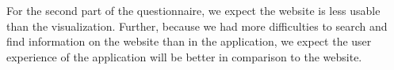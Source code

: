 For the second part of the questionnaire, we expect the website is less usable than the visualization. Further, because we had more difficulties to search and find information on the website than in the application, we expect the user experience of the application will be better in comparison to the website.








